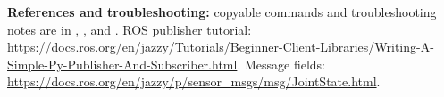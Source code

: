 \documentclass[12pt,letterpaper]{article}
\begin{document}
\textbf{References and troubleshooting:} copyable commands and
troubleshooting notes are in ,
, and . ROS publisher tutorial:
\url{https://docs.ros.org/en/jazzy/Tutorials/Beginner-Client-Libraries/Writing-A-Simple-Py-Publisher-And-Subscriber.html}.
Message fields: \url{https://docs.ros.org/en/jazzy/p/sensor_msgs/msg/JointState.html}.
\end{document}
